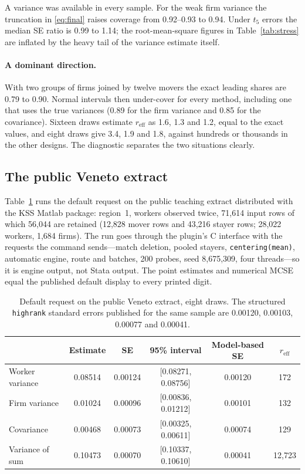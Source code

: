 \documentclass[11pt]{article}
\newcommand{\reff}{r_{\mathrm{eff}}}
\begin{document}
A variance was available in every sample. For the weak firm variance the
truncation in \eqref{eq:final} raises coverage from 0.92--0.93 to 0.94. Under
$t_5$ errors the median SE ratio is 0.99 to 1.14; the root-mean-square
figures in Table~\ref{tab:stress} are inflated by the heavy tail of the
variance estimate itself.

\paragraph{A dominant direction.} With two groups of firms joined by twelve
movers the exact leading shares are 0.79 to 0.90. Normal intervals then
under-cover for every method, including one that uses the true variances
(0.89 for the firm variance and 0.85 for the covariance). Sixteen draws
estimate $\reff$ as 1.6, 1.3 and 1.2, equal to the exact values, and eight
draws give 3.4, 1.9 and 1.8, against hundreds or thousands in the other
designs. The diagnostic separates the two situations clearly.

\subsection{The public Veneto extract}\label{sec:veneto}

Table~\ref{tab:veneto} runs the default request on the public teaching
extract distributed with the KSS Matlab package: region~1, workers observed
twice, 71,614 input rows of which 56,044 are retained (12,828 mover rows and
43,216 stayer rows; 28,022 workers, 1,684 firms). The run goes through the
plugin's C interface with the requests the command sends---match deletion,
pooled stayers, \texttt{centering(mean)}, automatic engine, route and
batches, 200 probes, seed 8,675,309, four threads---so it is engine output,
not Stata output. The point estimates and numerical MCSE equal the published
default display to every printed digit.

\begin{table}[ht]
\centering\small
\begin{tabular}{@{}lccccc@{}}
\toprule
 & Estimate & SE & 95\% interval & Model-based SE & $\reff$ \\
\midrule
Worker variance & 0.08514 & 0.00124 & [0.08271, 0.08756] & 0.00120 & 172 \\
Firm variance & 0.01024 & 0.00096 & [0.00836, 0.01212] & 0.00101 & 132 \\
Covariance & 0.00468 & 0.00073 & [0.00325, 0.00611] & 0.00074 & 129 \\
Variance of sum & 0.10473 & 0.00070 & [0.10337, 0.10610] & 0.00041 & 12,723 \\
\bottomrule
\end{tabular}
\caption{Default request on the public Veneto extract, eight draws. The
structured \texttt{highrank} standard errors published for the same sample
are 0.00120, 0.00103, 0.00077 and 0.00041.}\label{tab:veneto}
\end{table}
\end{document}
